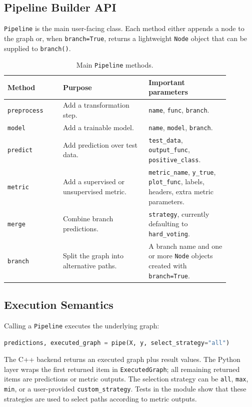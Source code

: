 \documentclass[11pt,a4paper]{article}
\begin{document}
\subsection{Pipeline Builder API}

\texttt{Pipeline} is the main user-facing class. Each method either appends a
node to the graph or, when \texttt{branch=True}, returns a lightweight
\texttt{Node} object that can be supplied to \texttt{branch()}.

\begin{table}[H]
\centering
\caption{Main \texttt{Pipeline} methods.}
\begin{tabular}{p{0.22\linewidth}p{0.34\linewidth}p{0.32\linewidth}}
\toprule
\textbf{Method} & \textbf{Purpose} & \textbf{Important parameters}\\
\midrule
\texttt{preprocess} & Add a transformation step. & \texttt{name},
\texttt{func}, \texttt{branch}.\\
\texttt{model} & Add a trainable model. & \texttt{name}, \texttt{model},
\texttt{branch}.\\
\texttt{predict} & Add prediction over test data. & \texttt{test\_data},
\texttt{output\_func}, \texttt{positive\_class}.\\
\texttt{metric} & Add a supervised or unsupervised metric. &
\texttt{metric\_name}, \texttt{y\_true}, \texttt{plot\_func}, labels,
headers, extra metric parameters.\\
\texttt{merge} & Combine branch predictions. & \texttt{strategy}, currently
defaulting to \texttt{hard\_voting}.\\
\texttt{branch} & Split the graph into alternative paths. & A branch name and
one or more \texttt{Node} objects created with \texttt{branch=True}.\\
\bottomrule
\end{tabular}
\end{table}

\subsection{Execution Semantics}

Calling a \texttt{Pipeline} executes the underlying graph:

\begin{lstlisting}[language=Python]
predictions, executed_graph = pipe(X, y, select_strategy="all")
\end{lstlisting}

The C++ backend returns an executed graph plus result values. The Python layer
wraps the first returned item in \texttt{ExecutedGraph}; all remaining returned
items are predictions or metric outputs. The selection strategy can be
\texttt{all}, \texttt{max}, \texttt{min}, or a user-provided
\texttt{custom\_strategy}. Tests in the module show that these strategies are
used to select paths according to metric outputs.
\end{document}
